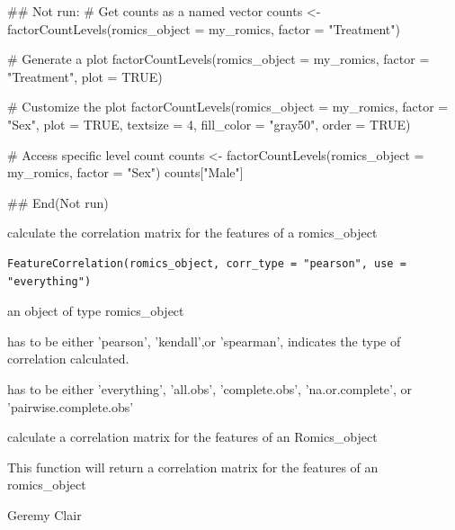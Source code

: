 \documentclass[a4paper]{book}
\begin{document}
%
\begin{Examples}
\begin{ExampleCode}
## Not run: 
# Get counts as a named vector
counts <- factorCountLevels(romics_object = my_romics, factor = "Treatment")

# Generate a plot
factorCountLevels(romics_object = my_romics, factor = "Treatment", plot = TRUE)

# Customize the plot
factorCountLevels(romics_object = my_romics, factor = "Sex",
                  plot = TRUE, textsize = 4, fill_color = "gray50", order = TRUE)

# Access specific level count
counts <- factorCountLevels(romics_object = my_romics, factor = "Sex")
counts["Male"]

## End(Not run)
\end{ExampleCode}
\end{Examples}
%
\begin{Description}
calculate the correlation matrix for the features of a romics\_object
\end{Description}
%
\begin{Usage}
\begin{verbatim}
FeatureCorrelation(romics_object, corr_type = "pearson", use = "everything")
\end{verbatim}
\end{Usage}
%
\begin{Arguments}
\begin{ldescription}
\item[\code{romics\_object}] an object of type romics\_object

\item[\code{corr\_type}] has to be either 'pearson', 'kendall',or 'spearman', indicates the type of correlation calculated.

\item[\code{use}] has to be either 'everything', 'all.obs', 'complete.obs', 'na.or.complete', or 'pairwise.complete.obs'
\end{ldescription}
\end{Arguments}
%
\begin{Details}
calculate a correlation matrix for the features of an Romics\_object
\end{Details}
%
\begin{Value}
This function will return a correlation matrix for the features of an romics\_object
\end{Value}
%
\begin{Author}
Geremy Clair
\end{Author}
\end{document}
